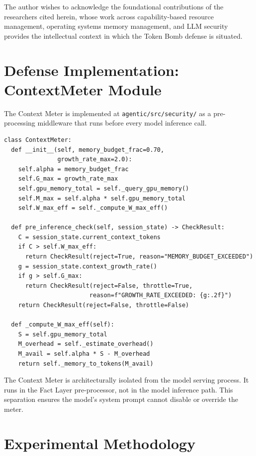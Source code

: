 \documentclass[12pt]{article}
\begin{document}
The author wishes to acknowledge the foundational contributions of the researchers cited herein, whose work across capability-based resource management, operating systems memory management, and LLM security provides the intellectual context in which the Token Bomb defense is situated.


\section{Defense Implementation: ContextMeter Module}
\label{sec:context-meter-impl}

The Context Meter is implemented at \texttt{agentic/src/security/} as a pre-processing middleware that runs before every model inference call.

\begin{verbatim}
class ContextMeter:
  def __init__(self, memory_budget_frac=0.70,
               growth_rate_max=2.0):
    self.alpha = memory_budget_frac
    self.G_max = growth_rate_max
    self.gpu_memory_total = self._query_gpu_memory()
    self.M_max = self.alpha * self.gpu_memory_total
    self.W_max_eff = self._compute_W_max_eff()

  def pre_inference_check(self, session_state) -> CheckResult:
    C = session_state.current_context_tokens
    if C > self.W_max_eff:
      return CheckResult(reject=True, reason="MEMORY_BUDGET_EXCEEDED")
    g = session_state.context_growth_rate()
    if g > self.G_max:
      return CheckResult(reject=False, throttle=True,
                        reason=f"GROWTH_RATE_EXCEEDED: {g:.2f}")
    return CheckResult(reject=False, throttle=False)

  def _compute_W_max_eff(self):
    S = self.gpu_memory_total
    M_overhead = self._estimate_overhead()
    M_avail = self.alpha * S - M_overhead
    return self._memory_to_tokens(M_avail)
\end{verbatim}

The Context Meter is architecturally isolated from the model serving process. It runs in the Fact Layer pre-processor, not in the model inference path. This separation ensures the model's system prompt cannot disable or override the meter.

\section{Experimental Methodology}
\label{sec:experimental-methodology}
\end{document}
